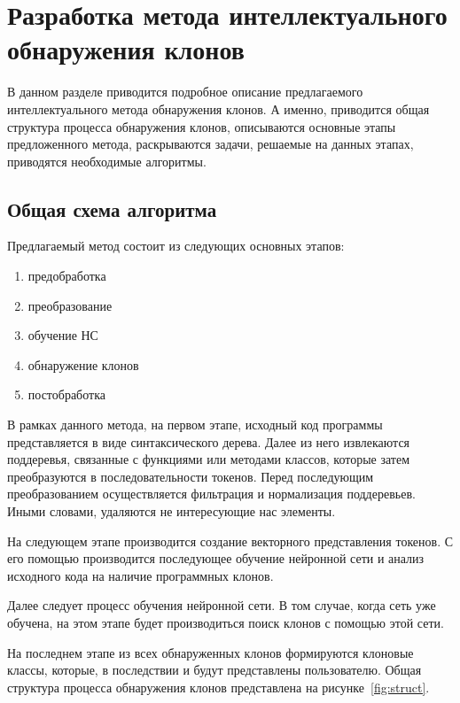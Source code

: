 \chapter{Разработка метода интеллектуального обнаружения клонов}
В данном разделе приводится подробное описание предлагаемого интеллектуального метода обнаружения клонов. А именно, приводится общая структура процесса обнаружения клонов, описываются основные этапы предложенного метода, раскрываются задачи, решаемые на данных этапах, приводятся необходимые алгоритмы. 
\section{Общая схема алгоритма}
Предлагаемый метод состоит из следующих основных этапов:
\begin{enumerate}
\setlength\itemsep{0mm}
\item предобработка
\item преобразование
\item обучение НС
\item обнаружение клонов
\item постобработка
\end{enumerate}

В рамках данного метода, на первом этапе, исходный код программы представляется в виде синтаксического дерева. Далее из него извлекаются поддеревья, связанные с функциями или методами классов, которые затем преобразуются в последовательности токенов. Перед последующим преобразованием осуществляется фильтрация и нормализация поддеревьев. Иными словами, удаляются не интересующие нас элементы.

На следующем этапе производится создание векторного представления токенов. С его помощью производится последующее обучение нейронной сети и анализ исходного кода на наличие программных клонов.

Далее следует процесс обучения нейронной сети. В том случае, когда сеть уже обучена, на этом этапе будет производиться поиск клонов с помощью этой сети.

На последнем этапе из всех обнаруженных клонов формируются клоновые классы, которые, в последствии и будут представлены пользователю. Общая структура процесса обнаружения клонов представлена на рисунке~\ref{fig:struct}.

